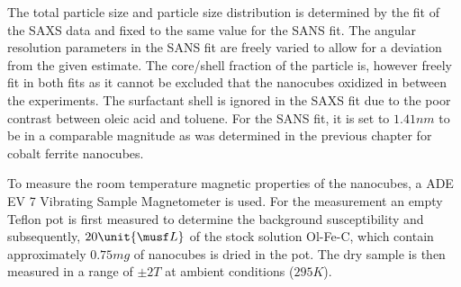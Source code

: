 \documentclass[\main/dresen_thesis.tex]{subfiles}
\begin{document}
    The total particle size and particle size distribution is determined by the fit of the SAXS data and fixed to the same value for the SANS fit.
    The angular resolution parameters in the SANS fit are freely varied to allow for a deviation from the given estimate.
    The core/shell fraction of the particle is, however freely fit in both fits as it cannot be excluded that the nanocubes oxidized in between the experiments.
    The surfactant shell is ignored in the SAXS fit due to the poor contrast between oleic acid and toluene.
    For the SANS fit, it is set to $1.41 \unit{nm}$ to be in a comparable magnitude as was determined in the previous chapter  for cobalt ferrite nanocubes.

    To measure the room temperature magnetic properties of the nanocubes, a ADE EV 7 Vibrating Sample Magnetometer is used.
    For the measurement an empty Teflon pot is first measured to determine the background susceptibility and subsequently, $20 \unit{\musf L}$ of the stock solution Ol-Fe-C, which contain approximately $0.75 \unit{mg}$ of nanocubes is dried in the pot.
    The dry sample is then measured in a range of $\pm 2 \unit{T}$ at ambient conditions ($295 \unit{K}$).
\end{document}
